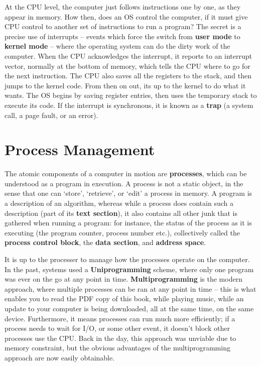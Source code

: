At the CPU level, the computer just follows instructions one by one, as they appear in memory. How then, does an OS control the computer, if it must give CPU control to another set of instructions to run a program? The secret is a precise use of interrupts -- events which force the switch from {\bf user mode} to {\bf kernel mode} -- where the operating system can do the dirty work of the computer. When the CPU acknowledges the interrupt, it reports to an interrupt vector, normally at the bottom of memory, which tells the CPU where to go for the next instruction. The CPU also saves all the registers to the stack, and then jumps to the kernel code. From then on out, its up to the kernel to do what it wants. The OS begins by saving register entries, then uses the temporary stack to execute its code. If the interrupt is synchronous, it is known as a {\bf trap} (a system call, a page fault, or an error).

\chapter{Process Management}

The atomic components of a computer in motion are {\bf processes}, which can be understood as a program in execution. A process is not a static object, in the sense that one can `store', `retrieve', or `edit' a process in memory. A program is a description of an algorithm, whereas while a process does contain such a description (part of its {\bf text section}), it also contains all other junk that is gathered when running a program: for instance, the status of the process as it is executing (the program counter, process number etc.), collectively called the {\bf process control block}, the {\bf data section}, and {\bf address space}.

It is up to the processer to manage how the processes operate on the computer. In the past, systems used a {\bf Uniprogramming} scheme, where only one program was ever on the go at any point in time. {\bf Multiprogramming} is the modern approach, where multiple processes can be ran at any point in time -- this is what enables you to read the PDF copy of this book, while playing music, while an update to your computer is being downloaded, all at the same time, on the same device. Furthermore, it means processes can run much more efficiently; if a process needs to wait for I/O, or some other event, it doesn't block other processes use the CPU. Back in the day, this approach was unviable due to memory constraint, but the obvious advantages of the multiprogramming approach are now easily obtainable.

